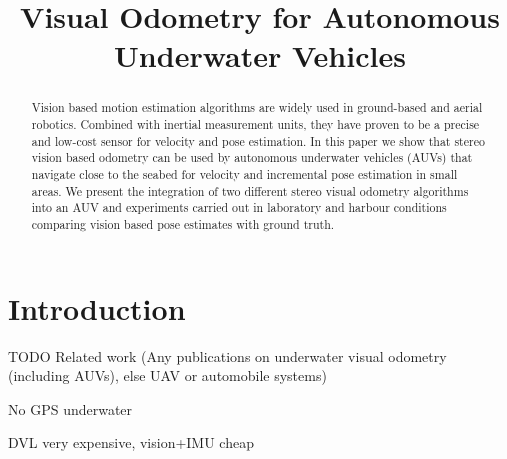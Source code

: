 \documentclass[conference]{IEEEtran}
\begin{document}
\title{Visual Odometry for Autonomous Underwater Vehicles}

\author{
\and
{}
\and
{}
}

\maketitle


\begin{abstract}
Vision based motion estimation algorithms are widely used in ground-based and aerial robotics. Combined with inertial measurement units, they have proven to be a precise and low-cost sensor for velocity and pose estimation. In this paper we show that stereo vision based odometry can be used by autonomous underwater vehicles (AUVs) that navigate close to the seabed for velocity and incremental pose estimation in small areas. We present the integration of two different stereo visual odometry algorithms into an AUV and experiments carried out in laboratory and harbour conditions comparing vision based pose estimates with ground truth.
\end{abstract}


\section{Introduction 
  \label{introduction}
}
TODO Related work
(Any publications on underwater visual odometry (including AUVs), else UAV or automobile systems)

No GPS underwater

DVL very expensive, vision+IMU cheap
\end{document}
